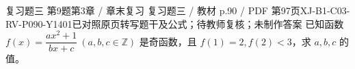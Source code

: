\par\noindent\begin{minipage}{\linewidth}
\begin{bankitem}{复习题三 第9题}{第3章 / 章末复习 复习题三 / 教材 p.90 / PDF 第97页}{XJ-B1-C03-RV-P090-Y1401}{已对照原页转写题干及公式；待教师复核；未制作答案}
已知函数 $f(x)=\dfrac{ax^2+1}{bx+c}\ (a,b,c\in\mathbb Z)$ 是奇函数，且 $f(1)=2,f(2)<3$，求 $a,b,c$ 的值。
\end{bankitem}
\end{minipage}\par\medskip
